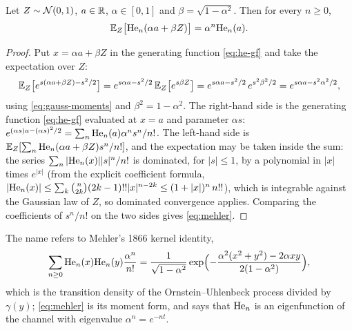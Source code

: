 \begin{theorem}
\label{thm:mehler}
Let $Z\sim\mathcal{N}\!\left(0,1\right)$, $a\in\mathbb{R}$, $\alpha\in[0,1]$ and $\beta=\sqrt{1-\alpha^2}$. Then
for every $n\ge0$,
\begin{equation}
  \mathbb{E}_Z\bigl[\mathrm{He}_{n}(\alpha a+\beta Z)\bigr]=\alpha^n\mathrm{He}_{n}(a).
  \label{eq:mehler}
\end{equation}
\end{theorem}
\begin{proof}
Put $x=\alpha a+\beta Z$ in the generating function \cref{eq:he-gf} and take the
expectation over $Z$:
\[
  \mathbb{E}_Z\bigl[e^{s(\alpha a+\beta Z)-s^2/2}\bigr]
  =e^{s\alpha a-s^2/2}\,\mathbb{E}_Z\bigl[e^{s\beta Z}\bigr]
  =e^{s\alpha a-s^2/2}\,e^{s^2\beta^2/2}
  =e^{s\alpha a-s^2\alpha^2/2},
\]
using \cref{eq:gauss-moments} and $\beta^2=1-\alpha^2$. The right-hand side is the
generating function \cref{eq:he-gf} evaluated at $x=a$ and parameter $\alpha s$:
$e^{(\alpha s)a-(\alpha s)^2/2}=\sum_n\mathrm{He}_{n}(a)\alpha^ns^n/n!$. The left-hand side is
$\mathbb{E}_Z[\sum_n\mathrm{He}_{n}(\alpha a+\beta Z)s^n/n!]$, and the expectation may be taken inside
the sum: the series $\sum_n|\mathrm{He}_{n}(x)||s|^n/n!$ is dominated, for $|s|\le1$, by a
polynomial in $|x|$ times $e^{|x|}$ (from the explicit coefficient formula,
$|\mathrm{He}_{n}(x)|\le\sum_k\binom n{2k}(2k-1)!!|x|^{n-2k}\le(1+|x|)^n\,n!!$), which is
integrable against the Gaussian law of $Z$, so dominated convergence applies.
Comparing the coefficients of $s^n/n!$ on the two sides gives \cref{eq:mehler}.
\end{proof}

The name refers to Mehler's 1866 kernel identity,
\[
  \sum_{n\ge0}\mathrm{He}_{n}(x)\mathrm{He}_{n}(y)\frac{\alpha^n}{n!}
  =\frac{1}{\sqrt{1-\alpha^2}}\exp\Bigl(-\frac{\alpha^2(x^2+y^2)-2\alpha xy}{2(1-\alpha^2)}\Bigr),
\]
which is the transition density of the Ornstein--Uhlenbeck process divided by
$\gamma(y)$; \cref{eq:mehler} is its moment form, and says that $\mathrm{He}_{n}$ is an
eigenfunction of the channel with eigenvalue $\alpha^n=e^{-nt}$.

